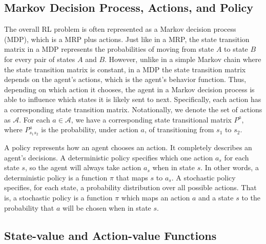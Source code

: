 \documentclass{article}
\begin{document}
\subsection{Markov Decision Process, Actions, and Policy}

The overall RL problem is often represented as a Markov decision process (MDP), which is a MRP plus actions. Just like in a MRP, the state transition matrix in a MDP represents the probabilities of moving from state $A$ to state $B$ for every pair of states $A$ and $B$. However, unlike in a simple Markov chain where the state transition matrix is constant, in a MDP the state transition matrix depends on the agent’s actions, which is the agent’s behavior function. Thus, depending on which action it chooses, the agent in a Markov decision process is able to influence which states it is likely sent to next. Specifically, each action has a corresponding state transition matrix. Notationally, we denote the set of actions as $\mathcal{A}$. For each $a \in \mathcal{A}$, we have a corresponding state transitional matrix $P^a$, where $P_{s_1s_2}^a$ is the probability, under action $a$, of transitioning from $s_1$ to $s_2$.

A policy represents how an agent chooses an action. It completely describes an agent’s decisions. A deterministic policy specifies which one action $a_s$ for each state $s$, so the agent will always take action $a_s$ when in state $s$. In other words, a deterministic policy is a function $\pi$ that maps $s$ to $a_s$. A stochastic policy specifies, for each state, a probability distribution over all possible actions. That is, a stochastic policy is a function $\pi$ which maps an action $a$ and a state $s$ to the probability that $a$ will be chosen when in state $s$.

\subsection{State-value and Action-value Functions}
\end{document}
